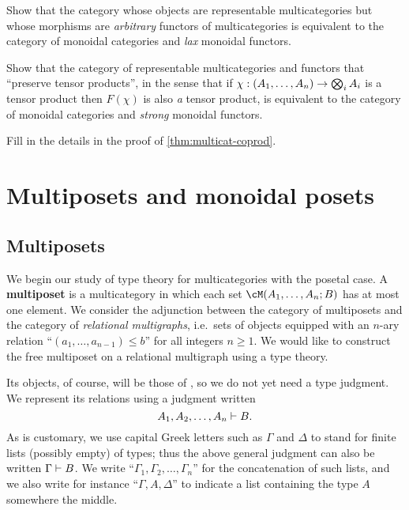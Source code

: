 \begin{ex}\label{ex:mcat-lax-func}
  Show that the category whose objects are representable multicategories but whose morphisms are \emph{arbitrary} functors of multicategories is equivalent to the category of monoidal categories and \emph{lax} monoidal functors.
\end{ex}

\begin{ex}\label{ex:mcat-strong-func}
  Show that the category of representable multicategories and functors that ``preserve tensor products'', in the sense that if $\chi:(A_1,\dots,A_n) \to \bigotimes_i A_i$ is a tensor product then $F(\chi)$ is also \emph{a} tensor product, is equivalent to the category of monoidal categories and \emph{strong} monoidal functors.
\end{ex}

\begin{ex}\label{ex:multicat-coprod}
  Fill in the details in the proof of \cref{thm:multicat-coprod}.
\end{ex}


\section{Multiposets and monoidal posets}
\label{sec:multiposets-monpos}

\subsection{Multiposets}
\label{sec:multiposets}

We begin our study of type theory for multicategories with the posetal case.
A \textbf{multiposet} is a multicategory in which each set $\cM(A_1,\dots,A_n;B)$ has at most one element.
We consider the adjunction between the category \bMPos of multiposets and the category \bRelMGr of \emph{relational multigraphs}, i.e.\ sets of objects equipped with an $n$-ary relation ``$(a_1,\dots,a_{n-1})\le b$'' for all integers $n\ge 1$.
We would like to construct the free multiposet on a relational multigraph \cG using a type theory.

Its objects, of course, will be those of \cG, so we do not yet need a type judgment.
We represent its relations using a judgment written
\[A_1,A_2,\dots,A_n \vdash B.\]
As is customary, we use capital Greek letters such as $\Gamma$ and $\Delta$ to stand for finite lists (possibly empty) of types; thus the above general judgment can also be written $\Gamma\vdash B$.
We write ``$\Gamma_1,\Gamma_2,\dots,\Gamma_n$'' for the concatenation of such lists, and we also write for instance ``$\Gamma,A,\Delta$'' to indicate a list containing the type $A$ somewhere the middle.

